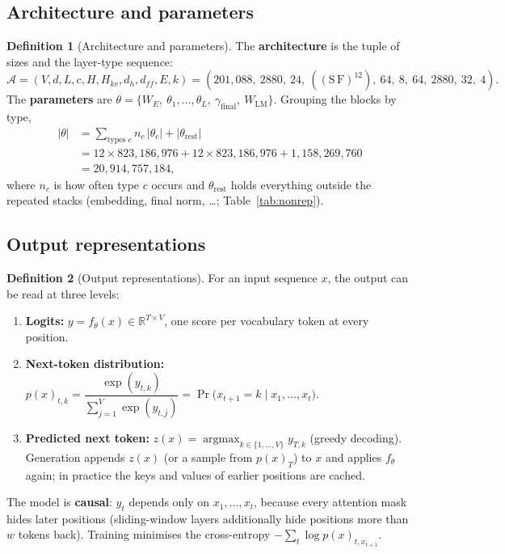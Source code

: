 \documentclass[10pt,a4paper]{article}
\theoremstyle{definition}
\newtheorem{definition}{Definition}[section]
\begin{document}
\subsection{Architecture and parameters}
\begin{definition}[Architecture and parameters]
The \textbf{architecture} is the tuple of sizes and the layer-type sequence:
\begin{equation}
  \mathcal{A} = (V,d,L,c,H,H_{kv},d_h,d_{ff},E,k) = (201{,}088,\ 2880,\ 24,\ ((\mathrm{S}\,\mathrm{F})^{12}),\ 64,\ 8,\ 64,\ 2880,\ 32,\ 4).
\end{equation}
The \textbf{parameters} are $\theta=\{W_E,\ \theta_1,\dots,\theta_L,\ \gamma_{\mathrm{final}},\ W_{\mathrm{LM}}\}$. Grouping the blocks by type,
\begin{align*}
  |\theta| &= \sum_{\text{types } c} n_c\,|\theta_c| + |\theta_{\mathrm{rest}}| \\
  &= 12\times823{,}186{,}976 + 12\times823{,}186{,}976 + 1{,}158{,}269{,}760 \\
  &= 20{,}914{,}757{,}184,
\end{align*}
where $n_c$ is how often type $c$ occurs and $\theta_{\mathrm{rest}}$ holds everything outside the repeated stacks (embedding, final norm, \dots; Table~\ref{tab:nonrep}).
\end{definition}
\subsection{Output representations}
\begin{definition}[Output representations]
For an input sequence $x$, the output can be read at three levels:
\begin{enumerate}
\item \textbf{Logits:} $y=f_\theta(x)\in\mathbb{R}^{T\times V}$, one score per vocabulary token at every position.
\item \textbf{Next-token distribution:} $p(x)_{t,k}=\dfrac{\exp(y_{t,k})}{\sum_{j=1}^{V}\exp(y_{t,j})}=\Pr\big(x_{t+1}=k\mid x_{1},\dots,x_{t}\big)$.
\item \textbf{Predicted next token:} $z(x)=\operatorname{argmax}_{k\in\{1,\dots,V\}} y_{T,k}$ (greedy decoding). Generation appends $z(x)$ (or a sample from $p(x)_{T}$) to $x$ and applies $f_\theta$ again; in practice the keys and values of earlier positions are cached.
\end{enumerate}
The model is \textbf{causal}: $y_t$ depends only on $x_1,\dots,x_t$, because every attention mask hides later positions (sliding-window layers additionally hide positions more than $w$ tokens back). Training minimises the cross-entropy $-\sum_{t}\log p(x)_{t,x_{t+1}}$.
\end{definition}
\end{document}
